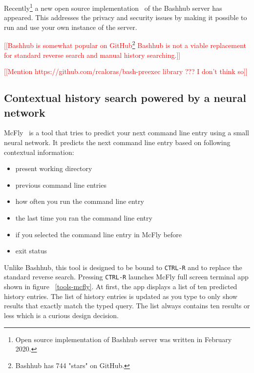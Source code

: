 \documentclass[thesis=M,english]{FITthesis}[2012/10/20]
\newcommand{\redtext}[1]{\textcolor{red}{[[#1]]}}
\let\myCite\cite
\renewcommand\cite{\unskip~\myCite}
\let\myRef\ref
\renewcommand\ref{\unskip~\myRef}
\begin{document}
Recently\footnote{Open source implementation of Bashhub server was written in February 2020.} a new open source implementation\cite{toolsbashhubserver} of the Bashhub server has appeared. This addresses the privacy and security issues by making it possible to run and use your own instance of the server.

\redtext{Bashhub is somewhat popular on GitHub\footnote{Bashhub has 744 "stars" on GitHub.}
Bashhub is not a viable replacement for standard reverse search and manual history searching.}



\redtext{Mention https://github.com/rcaloras/bash-preexec library ??? I don't think so}

\subsection{Contextual history search powered by a neural network}

McFly\cite{toolsmcfly} is a tool that tries to predict your next command line entry using a small neural network. It predicts the next command line entry based on following contextual information:
\begin{itemize}
    \item present working directory
    \item previous command line entries
    \item how often you run the command line entry
    \item the last time you ran the command line entry
    \item if you selected the command line entry in McFly before
    \item exit status
\end{itemize}

Unlike Bashhub, this tool is designed to be bound to \verb|CTRL-R| and to replace the standard reverse search. Pressing \verb|CTRL-R| launches McFly full screen terminal app shown in figure \ref{tools-mcfly}. At first, the app displays a list of ten predicted history entries. The list of history entries is updated as you type to only show results that exactly match the typed query. The list always contains ten results or less which is a curious design decision. 
\end{document}

